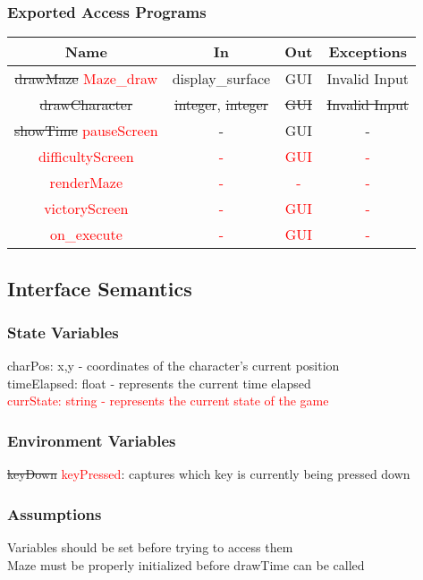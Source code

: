 \documentclass[12pt, titlepage]{article}
\begin{document}
		\subsubsection{Exported Access Programs}
		\begin{tabular}[pos]{|c|c|c|c|}
			\hline
			\textbf{Name}& \textbf{In} & \textbf{Out} & \textbf{Exceptions} \\ \hline
			\sout{drawMaze} \textcolor{red}{Maze\_draw} & display\_surface & GUI & Invalid Input \\ \hline
			\sout{drawCharacter} & \sout{integer}, \sout{integer} & \sout{GUI} & \sout{Invalid Input} \\ \hline
			\sout{showTime} \textcolor{red}{pauseScreen} & - & GUI & - \\ \hline
			\textcolor{red}{difficultyScreen} & \textcolor{red}{-} & \textcolor{red}{GUI} & \textcolor{red}{-} \\ \hline
			\textcolor{red}{renderMaze} & \textcolor{red}{-} & \textcolor{red}{-} & \textcolor{red}{-} \\ \hline
			\textcolor{red}{victoryScreen} & \textcolor{red}{-} & \textcolor{red}{GUI} & \textcolor{red}{-} \\ \hline
			\textcolor{red}{on\_execute} & \textcolor{red}{-} & \textcolor{red}{GUI} & \textcolor{red}{-} \\ \hline
		\end{tabular}
		
		\subsection{Interface Semantics}
		\subsubsection{State Variables}
		charPos: x,y - coordinates of the character's current position\\
		timeElapsed: float - represents the current time elapsed\\
		\textcolor{red}{currState: string - represents the current state of the game}
		\subsubsection{Environment Variables}
		\sout{keyDown} \textcolor{red}{keyPressed}: captures which key is currently being pressed down
		\subsubsection{Assumptions}
		Variables should be set before trying to access them \\ 
		Maze must be properly initialized before drawTime can be called
		
\end{document}
